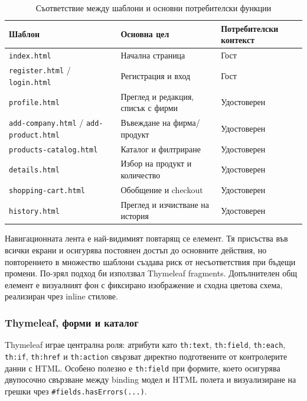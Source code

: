 \begin{table}[H]
    \centering
    \caption{Съответствие между шаблони и основни потребителски функции}
    \label{tab:template-mapping}
    \begin{tabularx}{\textwidth}{L{3.3cm}YY}
        \toprule
        Шаблон & Основна цел & Потребителски контекст \\
        \midrule
        \texttt{index.html} & Начална страница & Гост \\
        \texttt{register.html} / \texttt{login.html} & Регистрация и вход & Гост \\
        \texttt{profile.html} & Преглед и редакция, списък с фирми & Удостоверен \\
        \texttt{add-company.html} / \texttt{add-product.html} & Въвеждане на фирма/продукт & Удостоверен \\
        \texttt{products-catalog.html} & Каталог и филтриране & Удостоверен \\
        \texttt{details.html} & Избор на продукт и количество & Удостоверен \\
        \texttt{shopping-cart.html} & Обобщение и checkout & Удостоверен \\
        \texttt{history.html} & Преглед и изчистване на история & Удостоверен \\
        \bottomrule
    \end{tabularx}
\end{table}

Навигационната лента е най-видимият повтарящ се елемент. Тя присъства във всички екрани и осигурява постоянен достъп до основните действия, но повторението в множество шаблони създава риск от несъответствия при бъдещи промени. По-зрял подход би използвал Thymeleaf fragments. Допълнителен общ елемент е визуалният фон с фиксирано изображение и сходна цветова схема, реализиран чрез inline стилове.

\subsubsection{Thymeleaf, форми и каталог}

Thymeleaf \cite{thymeleaf} играе централна роля: атрибути като \texttt{th:text}, \texttt{th:field}, \texttt{th:each}, \texttt{th:if}, \texttt{th:href} и \texttt{th:action} свързват директно подготвените от контролерите данни с HTML. Особено полезно е \texttt{th:field} при формите, което осигурява двупосочно свързване между binding модел и HTML полета и визуализиране на грешки чрез \texttt{\#fields.hasErrors(...)}.

